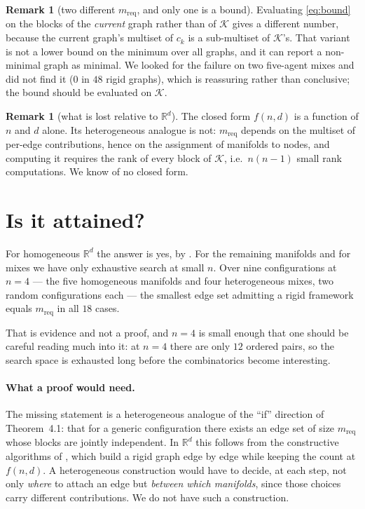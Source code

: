 \documentclass[11pt,a4paper]{article}
\theoremstyle{plain}
\theoremstyle{definition}
\newtheorem{remark}[theorem]{Remark}
\newcommand{\R}{\mathbb{R}}
\begin{document}
\begin{remark}[two different $m_{\text{req}}$, and only one is a bound]
Evaluating \eqref{eq:bound} on the blocks of the \emph{current} graph rather
than of $\mathcal K$ gives a different number, because the current graph's
multiset of $c_k$ is a sub-multiset of $\mathcal K$'s. That variant is not a
lower bound on the minimum over all graphs, and it can report a non-minimal
graph as minimal. We looked for the failure on two five-agent mixes and did not
find it (0 in $48$ rigid graphs), which is reassuring rather than conclusive;
the bound should be evaluated on $\mathcal K$.
\end{remark}

\begin{remark}[what is lost relative to $\R^d$]
The closed form $f(n,d)$ is a function of $n$ and $d$ alone. Its heterogeneous
analogue is not: $m_{\text{req}}$ depends on the multiset of per-edge
contributions, hence on the assignment of manifolds to nodes, and computing it
requires the rank of every block of $\mathcal K$, i.e.\ $n(n-1)$ small rank
computations. We know of no closed form.
\end{remark}

\section{Is it attained?}

For homogeneous $\R^d$ the answer is yes, by \cite[Thm.~4.1]{trinh2020}. For
the remaining manifolds and for mixes we have only exhaustive search at small
$n$. Over nine configurations at $n=4$ --- the five homogeneous manifolds and
four heterogeneous mixes, two random configurations each --- the smallest edge
set admitting a rigid framework equals $m_{\text{req}}$ in all $18$ cases.

That is evidence and not a proof, and $n=4$ is small enough that one should be
careful reading much into it: at $n=4$ there are only $12$ ordered pairs, so
the search space is exhausted long before the combinatorics become
interesting.

\paragraph{What a proof would need.}
The missing statement is a heterogeneous analogue of the ``if'' direction of
Theorem~4.1: that for a generic configuration there exists an edge set of size
$m_{\text{req}}$ whose blocks are jointly independent. In $\R^d$ this follows
from the constructive algorithms of \cite{trinh2020}, which build a rigid graph
edge by edge while keeping the count at $f(n,d)$. A heterogeneous construction
would have to decide, at each step, not only \emph{where} to attach an edge but
\emph{between which manifolds}, since those choices carry different
contributions. We do not have such a construction.
\end{document}
